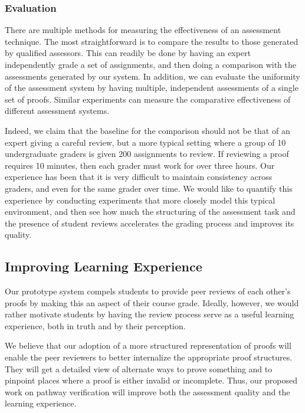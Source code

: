 \documentclass[12pt]{article}
\begin{document}
\subsubsection*{Evaluation}

There are multiple methods for measuring the effectiveness of an
assessment technique.  The most straightforward is to compare the
results to those generated by qualified assessors.  This can readily
be done by having an expert independently grade a set of
assignments, and then doing a comparison with the assessments
generated by our system.  In addition, we can evaluate the uniformity
of the assessment system by having multiple, independent assessments
of a single set of proofs.  Similar experiments can measure the
comparative effectiveness of different assessment systems.

Indeed, we claim that the baseline for the comparison
should not be that of an expert giving a careful review, but a more
typical setting where a group of 10 undergraduate graders is given 200
assignments to review.  If reviewing a proof requires 10 minutes, then
each grader must work for over three hours.  Our experience has been
that it is very difficult to maintain consistency across graders, and
even for the same grader over time.  We would like to quantify this
experience by conducting experiments that more closely model this
typical environment, and then see how much the structuring of the
assessment task and the presence of student
reviews accelerates the grading process and improves its quality.

\subsection{Improving Learning Experience}

Our prototype system compels students to provide peer reviews of each
other's proofs by making this an aspect of their course grade.
Ideally, however, we would
rather motivate students by having the review process serve as a useful
learning experience, both in truth and by their perception.

We believe that our adoption of a more structured representation of
proofs will enable the peer reviewers to better internalize the
appropriate proof structures.  They will get a detailed view of
alternate ways to prove something and to pinpoint places where a proof
is either invalid or incomplete.  Thus, our proposed work on pathway
verification will improve both the assessment quality and the learning
experience. 
\end{document}
